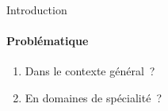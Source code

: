 \begin{frame}{Introduction}\framesubtitle{Problématique}
  \begin{enumerate}
    \item<+->{Dans le contexte général~?}
    \item<+->{En domaines de spécialité~?}
  \end{enumerate}

  \vspace{1em}

\end{frame}

